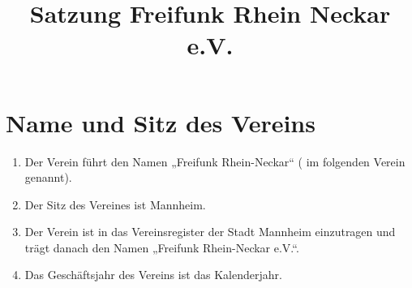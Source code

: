 \documentclass[12pt,a4paper,titlepage]{scrartcl}
\title{Satzung Freifunk Rhein Neckar e.V.}
\begin{document}
\maketitle
{}
\thispagestyle{empty}
\newpage
{}
\setcounter{page}{1}

\section{Name und Sitz des Vereins}
\begin{enumerate}
\item Der Verein führt den Namen „Freifunk Rhein-Neckar“ ( im folgenden Verein genannt).
\item Der Sitz des Vereines ist Mannheim.
\item Der Verein ist in das Vereinsregister der Stadt Mannheim einzutragen und trägt 
danach den Namen „Freifunk Rhein-Neckar e.V.“.
\item Das Geschäftsjahr des Vereins ist das Kalenderjahr. 
\end{enumerate}
\end{document}
